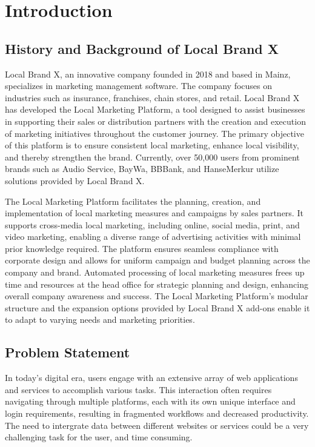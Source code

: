 \chapter{Introduction}
\label{ch:introduction}


\section{History and Background of Local Brand X}
\label{sec:intro:background}
Local Brand X, an innovative company founded in 2018 and based in Mainz, specializes in marketing management software. The company focuses on industries such as insurance, franchises, chain stores, and retail. Local Brand X has developed the Local Marketing Platform, a tool designed to assist businesses in supporting their sales or distribution partners with the creation and execution of marketing initiatives throughout the customer journey. The primary objective of this platform is to ensure consistent local marketing, enhance local visibility, and thereby strengthen the brand. Currently, over 50,000 users from prominent brands such as Audio Service, BayWa, BBBank, and HanseMerkur utilize solutions provided by Local Brand X.

The Local Marketing Platform facilitates the planning, creation, and implementation of local marketing measures and campaigns by sales partners. It supports cross-media local marketing, including online, social media, print, and video marketing, enabling a diverse range of advertising activities with minimal prior knowledge required. The platform ensures seamless compliance with corporate design and allows for uniform campaign and budget planning across the company and brand. Automated processing of local marketing measures frees up time and resources at the head office for strategic planning and design, enhancing overall company awareness and success. The Local Marketing Platform's modular structure and the expansion options provided by Local Brand X add-ons enable it to adapt to varying needs and marketing priorities.

%
%
\section{Problem Statement}
\label{sec:intro:motivation}
In today's digital era, users engage with an extensive array of web applications and services to accomplish various tasks. This interaction often requires navigating through multiple platforms, each with its own unique interface and login requirements, resulting in fragmented workflows and decreased productivity. The need to intergrate data between different websites or services could be a very challenging task for the user, and time consuming.

